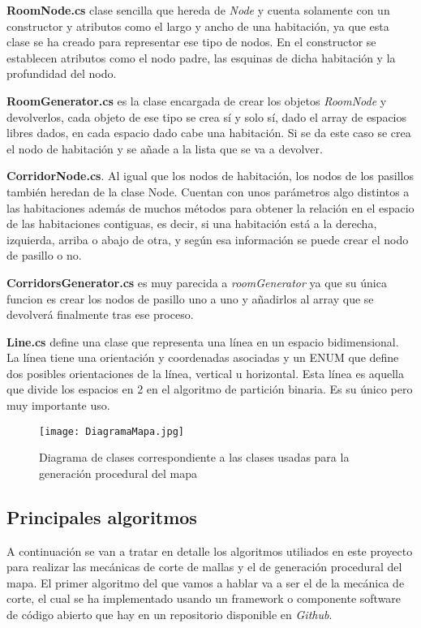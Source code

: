 \textbf{RoomNode.cs} clase sencilla que hereda de \textit{Node} y cuenta solamente con un constructor y atributos como el largo y ancho de una habitación, ya que esta clase se ha creado para representar ese tipo de nodos. En el constructor se establecen atributos como el nodo padre, las esquinas de dicha habitación y la profundidad del nodo.

\textbf{RoomGenerator.cs} es la clase encargada de crear los objetos \textit{RoomNode} y devolverlos, cada objeto de ese tipo se crea sí y solo sí, dado el array de espacios libres dados, en cada espacio dado cabe una habitación. Si se da este caso se crea el nodo de habitación y se añade a la lista que se va a devolver.

\textbf{CorridorNode.cs}. Al igual que los nodos de habitación, los nodos de los pasillos también heredan de la clase Node. Cuentan con unos parámetros algo distintos a las habitaciones además de muchos métodos para obtener la relación en el espacio de las habitaciones contiguas, es decir, si una habitación está a la derecha, izquierda, arriba o abajo de otra, y según esa información se puede crear el nodo de pasillo o no.

\textbf{CorridorsGenerator.cs} es muy parecida a \textit{roomGenerator} ya que su única funcion es crear los nodos de pasillo uno a uno y añadirlos al array que se devolverá finalmente tras ese proceso.

\textbf{Line.cs} define una clase que representa una línea en un espacio bidimensional. La línea tiene una orientación y coordenadas asociadas y un ENUM que define dos posibles orientaciones de la línea, vertical u horizontal. Esta línea es aquella que divide los espacios en 2 en el algoritmo de partición binaria. Es su único pero muy importante uso.

\begin{figure}[H]
    \centering
    \texttt{[image: DiagramaMapa.jpg]}
    \caption{Diagrama de clases correspondiente a las clases usadas para la generación procedural del mapa}
\end{figure}

\subsection{Principales algoritmos}

A continuación se van a tratar en detalle los algoritmos utiliados en este proyecto para realizar las mecánicas de corte de mallas y el de generación procedural del mapa. El primer algoritmo del que vamos a hablar va a ser el de la mecánica de corte, el cual se ha implementado usando un framework o componente software de código abierto que hay en un repositorio disponible en \textit{Github}. 

